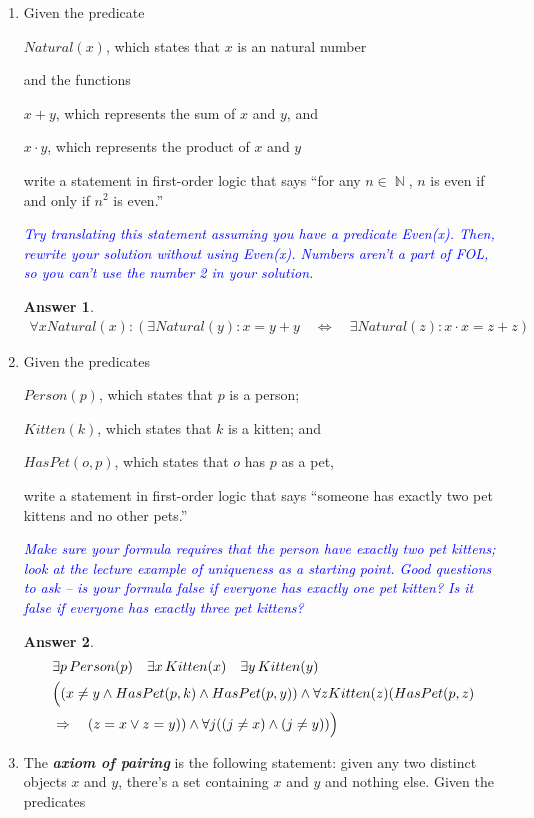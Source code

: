 \documentclass[a4paper]{article}
\renewcommand{\(}{\left(}
\renewcommand{\)}{\right)}
\DeclareMathOperator{\N}{\mathds{N}}
\theoremstyle{plain}
\theoremstyle{plain}
\theoremstyle{definition}
\newtheorem*{answer}{Answer}
\begin{document}
\begin{enumerate}[label*=\roman*.,ref=\roman*]
\item Given the predicate

\qquad $\textit{Natural}(x)$,
which states that $x$ is an natural number

and the functions

\qquad $x + y$, which represents the sum of $x$ and $y$, and

\qquad $x \cdot y$, which represents the product of $x$ and $y$

write a statement in first-order logic that says
``for any $n \in \N$, $n$ is even if and only if
$n^2$ is even.''

\textit{\textcolor{blue}{Try translating this statement assuming you have a predicate Even(x). Then, rewrite your solution without
using Even(x). Numbers aren't a part of FOL, so you can't use the number 2 in your solution.}}

\begin{shaded}
\begin{answer}
\begin{align*}
\forall x Natural(x) : ( \exists Natural(y) : x = y + y \quad \Leftrightarrow \quad \exists Natural(z) : x \cdot x = z + z)
\end{align*}
\end{answer}
\end{shaded}
\item Given the predicates

\qquad $\textit{Person}(p)$,
which states that $p$ is a person;

\qquad $\textit{Kitten}(k)$,
which states that $k$ is a kitten; and

\qquad $\textit{HasPet}(o, p)$,
which states that $o$ has $p$ as a pet,

write a statement in first-order logic that says
``someone has exactly two pet kittens and no other
pets.''

\textit{\textcolor{blue}{ Make sure your formula requires that the person
have \textit{exactly} two pet kittens; look at the lecture example of
uniqueness as a starting point. Good questions to ask --
is your formula false if everyone has exactly one pet
kitten? Is it false if everyone has exactly three pet kittens? }}
\begin{shaded}
\begin{answer}
\begin{align*}
&\exists p \, Person(p) \quad \exists x \, Kitten(x) \quad \exists y \, Kitten(y) \\
&\Bigl((x \neq y\wedge HasPet(p,k) \wedge HasPet(p,y)) \wedge \forall z Kitten(z) (HasPet(p,z) \\
&\Rightarrow \quad (z=x \vee z=y)) \wedge \forall j ((j \neq x) \wedge (j \neq y)) \Bigr)
\end{align*}
\end{answer}
\end{shaded}
\item The \textbf{\textit{axiom of pairing}}
is the following statement:
given any two distinct objects $x$ and $y$,
there's a set containing $x$ and $y$ and nothing else.
Given the predicates


\end{enumerate}
\end{document}
